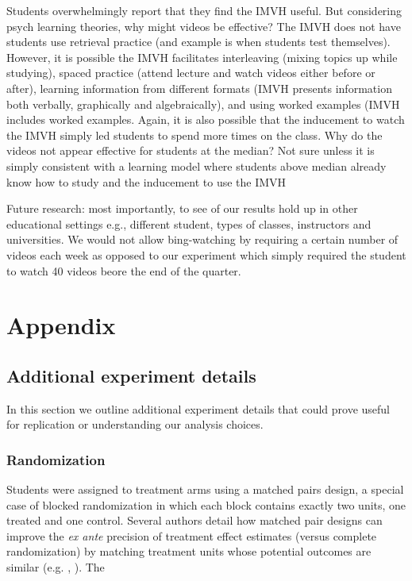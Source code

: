 \documentclass[12pt]{article}
\begin{document}
Students overwhelmingly report that they find the IMVH useful. But considering psych learning theories, why might videos be effective?   The IMVH does not have students use retrieval practice (and example is when students test themselves).  However, it is possible the IMVH facilitates interleaving (mixing topics up while studying), spaced practice (attend lecture and watch videos either before or after), learning information from different formats (IMVH presents information both verbally, graphically and algebraically), and using worked examples (IMVH includes worked examples.  Again, it is also possible that the inducement to watch the IMVH simply led students to spend more times on the class.  Why do the videos not appear effective for students at the median?  Not sure unless it is simply consistent with a learning model where students above median already know how to study and the inducement to use the IMVH   

Future research: most importantly, to see of our results hold up in other educational settings e.g., different student, types of classes, instructors and universities. We would not allow bing-watching by requiring a certain number of videos each week as opposed to our experiment which simply required the student to watch 40 videos beore the end of the quarter.


\printbibliography


\section*{Appendix}

\renewcommand{\thesubsection}{\Alph{subsection}}

\subsection{Additional experiment details}

In this section we outline additional experiment details that could prove useful for replication or understanding our analysis choices.

\subsubsection{Randomization} \label{a_randomization}
Students were assigned to treatment arms using a matched pairs design, a special case of blocked randomization in which each block contains exactly two units, one treated and one control. Several authors detail how matched pair designs can improve the \textit{ex ante} precision of treatment effect estimates (versus complete randomization) by matching treatment units whose potential outcomes are similar (e.g. \cite{ir2015}, \cite{ai2017}). The
\end{document}

